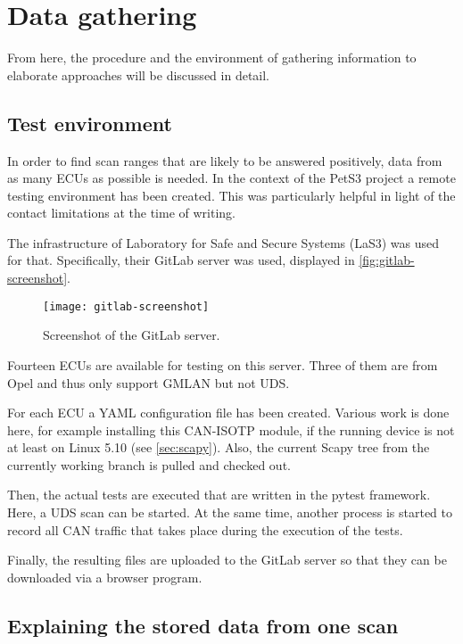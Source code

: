 \section{Data gathering}
\label{sec:data-gathering}

From here, the procedure and the environment of gathering information to elaborate approaches will be discussed in detail.

\subsection{Test environment}

In order to find scan ranges that are likely to be answered positively, data from as many ECUs as possible is needed. In the context of the PetS3 project a remote testing environment has been created. This was particularly helpful in light of the contact limitations at the time of writing.

The infrastructure of Laboratory for Safe and Secure Systems (LaS3) was used for that. Specifically, their GitLab server was used, displayed in \autoref{fig:gitlab-screenshot}.

\begin{figure}[h]
    \centering
    \texttt{[image: gitlab-screenshot]}
    \caption{Screenshot of the GitLab server.}
    \label{fig:gitlab-screenshot}
\end{figure}

Fourteen ECUs are available for testing on this server. Three of them are from Opel and thus only support GMLAN but not UDS.

For each ECU a YAML configuration file has been created. Various work is done here, for example installing this CAN-ISOTP module, if the running device is not at least on Linux 5.10 (see \autoref{sec:scapy}). Also, the current Scapy tree from the currently working branch is pulled and checked out.

Then, the actual tests are executed that are written in the pytest framework. Here, a UDS scan can be started. At the same time, another process is started to record all CAN traffic that takes place during the execution of the tests.

Finally, the resulting files are uploaded to the GitLab server so that they can be downloaded via a browser program.

\subsection{Explaining the stored data from one scan}

